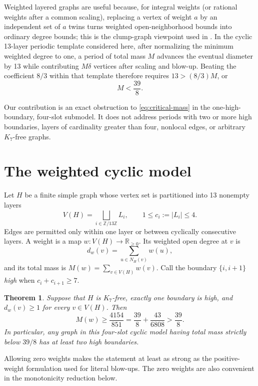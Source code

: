 \documentclass[11pt]{article}
\newtheorem{theorem}{Theorem}
\theoremstyle{remark}
\newcommand{\Zthirteen}{\mathbb Z/13\mathbb Z}
\begin{document}
Weighted layered graphs are useful because, for integral weights (or rational
weights after a common scaling), replacing a vertex of weight $a$ by an
independent set of $a$ twins turns weighted open-neighborhood bounds into
ordinary degree bounds; this is the clump-graph viewpoint used in
\cite{CzabarkaSinggihSzekely2021,ChenChen2026}.  In the cyclic 13-layer
periodic template considered here, after normalizing the minimum weighted
degree to one, a period of total mass $M$ advances the eventual diameter by
13 while contributing $M\delta$ vertices after scaling and blow-up.  Beating
the coefficient $8/3$ within that template therefore requires
$13>(8/3)M$, or
\begin{equation}\label{eq:critical-mass}
 M<\frac{39}{8}.
\end{equation}

Our contribution is an exact obstruction to \eqref{eq:critical-mass} in the
one-high-boundary, four-slot submodel.  It does not address periods with two
or more high boundaries, layers of cardinality greater than four, nonlocal
edges, or arbitrary $K_7$-free graphs.

\section{The weighted cyclic model}

Let $H$ be a finite simple graph whose vertex set is partitioned into 13
nonempty layers
\[
 V(H)=\bigsqcup_{i\in\Zthirteen}L_i,
 \qquad 1\leq c_i:=|L_i|\leq4.
\]
Edges are permitted only within one layer or between cyclically consecutive
layers.  A weight is a map $w:V(H)\to\mathbb R_{\geq0}$.  Its weighted open
degree at $v$ is
\[
 d_w(v)=\sum_{u\in N_H(v)}w(u),
\]
and its total mass is $M(w)=\sum_{v\in V(H)}w(v)$.  Call the boundary
$\{i,i+1\}$ \emph{high} when $c_i+c_{i+1}\geq7$.

\begin{theorem}\label{thm:main}
Suppose that $H$ is $K_7$-free, exactly one boundary is high, and
$d_w(v)\geq1$ for every $v\in V(H)$.  Then
\[
 M(w)\geq\frac{4154}{851}
       =\frac{39}{8}+\frac{43}{6808}>\frac{39}{8}.
\]
In particular, any graph in this four-slot cyclic model having total mass
strictly below $39/8$ has at least two high boundaries.
\end{theorem}

Allowing zero weights makes the statement at least as strong as the
positive-weight formulation used for literal blow-ups.  The zero weights are
also convenient in the monotonicity reduction below.
\end{document}
